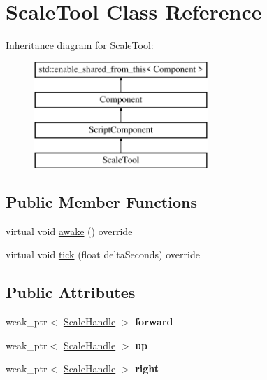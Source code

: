 \hypertarget{class_scale_tool}{}\section{Scale\+Tool Class Reference}
\label{class_scale_tool}
Inheritance diagram for Scale\+Tool\+:\begin{figure}[H]
\begin{center}
\leavevmode
\includegraphics[height=4.000000cm]{class_scale_tool}
\end{center}
\end{figure}
\subsection*{Public Member Functions}
\begin{DoxyCompactItemize}
\item 
virtual void \hyperlink{class_scale_tool_abd0df3bb4452336ac89b914968b91f39}{awake} () override
\item 
virtual void \hyperlink{class_scale_tool_a7ffc744426c942638ff24331de593496}{tick} (float delta\+Seconds) override
\end{DoxyCompactItemize}
\subsection*{Public Attributes}
\begin{DoxyCompactItemize}
\item 
\hypertarget{class_scale_tool_acbb72413a93ac68025de2178fbba5c04}{}weak\+\_\+ptr$<$ \hyperlink{class_scale_handle}{Scale\+Handle} $>$ {\bfseries forward}\label{class_scale_tool_acbb72413a93ac68025de2178fbba5c04}

\item 
\hypertarget{class_scale_tool_a7c4ec3709e2e7d7788cb5f53aba93cd1}{}weak\+\_\+ptr$<$ \hyperlink{class_scale_handle}{Scale\+Handle} $>$ {\bfseries up}\label{class_scale_tool_a7c4ec3709e2e7d7788cb5f53aba93cd1}

\item 
\hypertarget{class_scale_tool_a9af1ccb894e45369aec42c5b34d8bd29}{}weak\+\_\+ptr$<$ \hyperlink{class_scale_handle}{Scale\+Handle} $>$ {\bfseries right}\label{class_scale_tool_a9af1ccb894e45369aec42c5b34d8bd29}

\end{DoxyCompactItemize}
